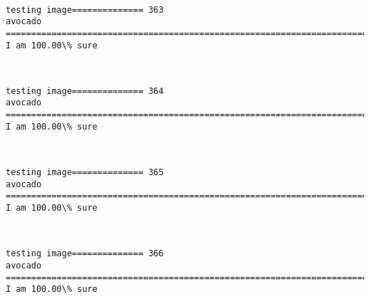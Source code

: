 \documentclass[11pt]{article}
\begin{document}
    \begin{center}
    \end{center}
    { \hspace*{\fill} \\}
    
    \begin{Verbatim}[commandchars=\\\{\}]
testing image============== 363
avocado
============================================================================
I am 100.00\% sure

    \end{Verbatim}

    \begin{center}
    \end{center}
    { \hspace*{\fill} \\}
    
    \begin{Verbatim}[commandchars=\\\{\}]
testing image============== 364
avocado
============================================================================
I am 100.00\% sure

    \end{Verbatim}

    \begin{center}
    \end{center}
    { \hspace*{\fill} \\}
    
    \begin{Verbatim}[commandchars=\\\{\}]
testing image============== 365
avocado
============================================================================
I am 100.00\% sure

    \end{Verbatim}

    \begin{center}
    \end{center}
    { \hspace*{\fill} \\}
    
    \begin{Verbatim}[commandchars=\\\{\}]
testing image============== 366
avocado
============================================================================
I am 100.00\% sure

    \end{Verbatim}
\end{document}
